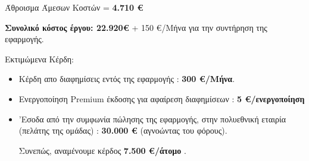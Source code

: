 \documentclass{../ol-softwaremanual}
\begin{document}
	Άθροισμα Άμεσων Κοστών = \textbf{4.710 €}
	
	\vspace{20pt}
	
	\textbf{Συνολικό κόστος έργου: 22.920€ } + 150 €/Μήνα για την συντήρηση της εφαρμογής.
	
	\vspace{20pt}
	
	
	Εκτιμώμενα Κέρδη:
	
	\begin{itemize}
		\item Κέρδη απο διαφημίσεις εντός της εφαρμογής : \textbf{300 €/Μήνα}.
		\item Ενεργοποίηση \en Premium \gr έκδοσης για αφαίρεση διαφημίσεων : \textbf{5 €/ενεργοποίηση}
		
		\item 'Εσοδα από την συμφωνία πώλησης της εφαρμογής, στην πολυεθνική εταιρία (πελάτης της ομάδας) : \textbf{30.000 €} (αγνοώντας του φόρους).
		
		Συνεπώς, αναμένουμε κέρδος \textbf{7.500 €/άτομο} .
		
	\end{itemize}
	
	
	
\end{document}
